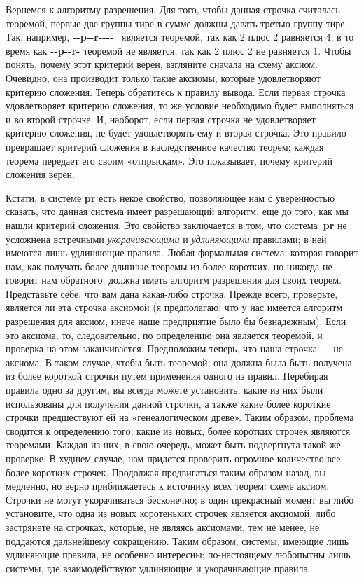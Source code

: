 Вернемся к алгоритму разрешения. Для того, чтобы данная строчка считалась теоремой, первые две группы тире в сумме должны давать третью группу тире. Так, например, \textbf{-\/-p-\/-r-\/-\/-\/-} ~является теоремой, так как 2 плюс 2 равняется 4, в то время как \textbf{-\/-p-\/-r-} теоремой не является, так как 2 плюс 2 не равняется 1. Чтобы понять, почему этот критерий верен, взгляните сначала на схему аксиом. Очевидно, она производит только такие аксиомы, которые удовлетворяют критерию сложения. Теперь обратитесь к правилу вывода. Если первая строчка удовлетворяет критерию сложения, то же условие необходимо будет выполняться и во второй строчке. И, наоборот, если первая строчка не удовлетворяет критерию сложения, не будет удовлетворять ему и вторая строчка. Это правило превращает критерий сложения в наследственное качество теорем; каждая теорема передает его своим «отпрыскам». Это показывает, почему критерий сложения верен.

Кстати, в системе \textbf{pr} есть некое свойство, позволяющее нам с уверенностью сказать, что данная система имеет разрешающий алгоритм, еще до того, как мы нашли критерий сложения. Это свойство заключается в том, что система\textbf{~pr} не усложнена встречными \emph{укорачивающими} и \emph{удлиняющими} правилами; в ней имеются лишь удлиняющие правила. Любая формальная система, которая говорит нам, как получать более длинные теоремы из более коротких, но никогда не говорит нам обратного, должна иметь алгоритм разрешения для своих теорем. Представьте себе, что вам дана какая-либо строчка. Прежде всего, проверьте, является ли эта строчка аксиомой (я предполагаю, что у нас имеется алгоритм разрешения для аксиом, иначе наше предприятие было бы безнадежным). Если это аксиома, то, следовательно, по определению она является теоремой, и проверка на этом заканчивается. Предположим теперь, что наша строчка --- не аксиома. В таком случае, чтобы быть теоремой, она должна была быть получена из более короткой строчки путем применения одного из правил. Перебирая правила одно за другим, вы всегда можете установить, какие из них были использованы для получения данной строчки, а также какие более короткие строчки предшествуют ей на «генеалогическом древе». Таким образом, проблема сводится к определению того, какие из новых, более коротких строчек являются теоремами. Каждая из них, в свою очередь, может быть подвергнута такой же проверке. В худшем случае, нам придется проверить огромное количество все более коротких строчек. Продолжая продвигаться таким образом назад, вы медленно, но верно приближаетесь к источнику всех теорем: схеме аксиом. Строчки не могут укорачиваться бесконечно; в один прекрасный момент вы либо установите, что одна из новых коротеньких строчек является аксиомой, либо застрянете на строчках, которые, не являясь аксиомами, тем не менее, не поддаются дальнейшему сокращению. Таким образом, системы, имеющие лишь удлиняющие правила, не особенно интересны; по-настоящему любопытны лишь системы, где взаимодействуют удлиняющие и укорачивающие правила.

